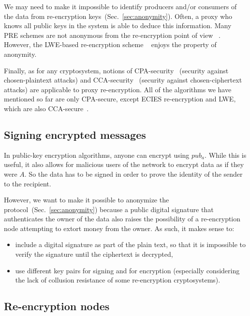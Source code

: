 \documentclass[longbibliography,nofootinbib]{revtex4-1}
\begin{document}
We may need to make it impossible to identify producers and/or consumers of the data from re-encryption keys~(Sec.~\ref{sec:anonymity}).
Often, a proxy who knows all public keys in the system is able to deduce this information. 
Many PRE schemes are not anonymous from the re-encryption point of view ~\cite{BBS98,AFGH}. However, the LWE-based re-encryption scheme ~\cite{lwe-reencryption} enjoys the property of anonymity.

Finally, as for any cryptosystem, notions of CPA-security~\cite{wiki:cpa} (security against chosen-plaintext attacks)
and CCA-security~\cite{wiki:cca} (security against chosen-ciphertext attacks) are applicable to proxy re-encryption.
All of the algorithms we have mentioned so far are only CPA-secure, except ECIES re-encryption and LWE, which are also CCA-secure~\cite{lwe-reencryption}.

\subsection{Signing encrypted messages}

In public-key encryption algorithms, anyone can encrypt using $pub_a$.
While this is useful, it also allows for malicious users of the network to encrypt data as if they were $A$.
So the data has to be signed in order to prove the identity of the sender to the recipient.

However, we want to make it possible to anonymize the protocol~(Sec.~\ref{sec:anonymity}) because
a public digital signature that authenticates the owner of the data also raises the possibility of a re-encryption node attempting to extort money from the owner.
As such, it makes sense to:
\begin{itemize}
    \item include a digital signature as part of the plain text, so that it is impossible to verify the signature until the ciphertext is decrypted,
    \item use different key pairs for signing and for encryption (especially considering the lack of collusion resistance of some re-encryption
        cryptosystems).
\end{itemize}

\subsection{Re-encryption nodes}
\end{document}
